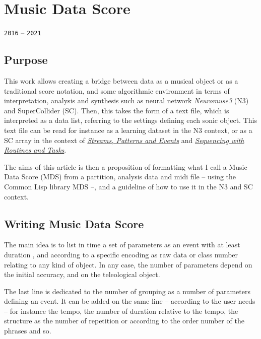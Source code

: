 \chapter{Music Data Score}
\thispagestyle{empty}

\label{mds}
{\texttt{2016} -- \texttt{2021}}

\bigskip
\smallskip

\section{Purpose}
\label{purp}

This work allows creating a bridge between data as a musical object or as a traditional score notation, and some algorithmic environment in terms of interpretation, analysis and synthesis such as neural network \textsl{Neuromuse3} (N3) and SuperCollider (SC). 
Then, this takes the form of a text file, which is interpreted as a data list, referring to the settings defining each sonic object. This text file can be read for instance as a learning dataset  in the N3 context, 
or as a SC array in the context of \href{http://doc.sccode.org/Tutorials/Streams-Patterns-Events1.html}{\textit{Streams, Patterns and Events}} and \href{http://doc.sccode.org/Tutorials/Getting-Started/15-Sequencing-with-Routines-and-Tasks.html}{\textit{Sequencing with Routines and Tasks}}.

The aims of this article is then a proposition of formatting what I call a Music Data Score (MDS) from a partition, analysis data and midi file -- using the Common Lisp library MDS --, and a guideline of how to use it in the N3 and SC context.

\section{Writing Music Data Score}

The main idea is to list in time a set of parameters as an event with at least duration , and according to a specific encoding as raw data or class number relating to any kind of object. In any case, the number of parameters depend on the initial accuracy, and on the teleological object.

The last line is dedicated to the number of grouping as a number of parameters defining an event. It can be added on the same line -- according to the user needs -- for instance the tempo, the number of duration relative to the tempo, the structure as the number of repetition or according to the order number of the phrases and so.

